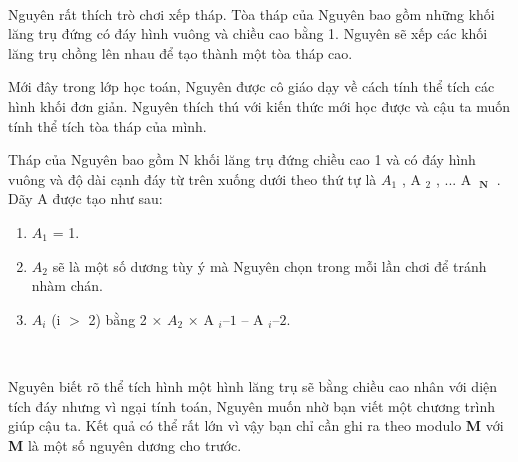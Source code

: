  

Nguyên rất thích trò chơi xếp tháp. Tòa tháp của Nguyên bao gồm những khối lăng trụ đứng có đáy hình vuông và chiều cao bằng 1. Nguyên sẽ xếp các khối lăng trụ chồng lên nhau để tạo thành một tòa tháp cao.

Mới đây trong lớp học toán, Nguyên được cô giáo dạy về cách tính thể tích các hình khối đơn giản. Nguyên thích thú với kiến thức mới học được và cậu ta muốn tính thể tích tòa tháp của mình.

Tháp của Nguyên bao gồm N khối lăng trụ đứng chiều cao 1 và có đáy hình vuông và độ dài cạnh đáy từ trên xuống dưới theo thứ tự là $A_{1}$ , A­­­ $_ 2 $ , ... A­­ $_\textbf{ N }$ . Dãy A được tạo như sau:
\begin{enumerate}
	\item $A_{1}$ = 1.
	\item $A_{2}$ sẽ là một số dương tùy ý mà Nguyên chọn trong mỗi lần chơi để tránh nhàm chán.
	\item $A_{i}$ (i $>$ 2) bằng 2 × $A_{2}$ × A $_ i  – 1 $ – A­ $_ i – 2. $
\end{enumerate}

 

Nguyên biết rõ thể tích hình một hình lăng trụ sẽ bằng chiều cao nhân với diện tích đáy nhưng vì ngại tính toán, Nguyên muốn nhờ bạn viết một chương trình giúp cậu ta. Kết quả có thể rất lớn vì vậy bạn chỉ cần ghi ra theo modulo \textbf{ M } với \textbf{ M } là một số nguyên dương cho trước.